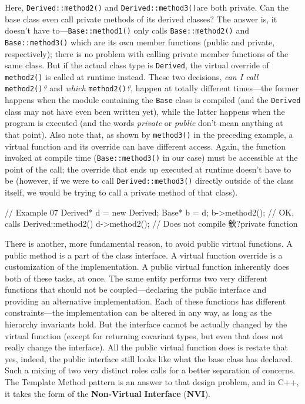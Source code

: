 Here, \texttt{Derived::method2()} and \texttt{Derived::method3()}are both private. Can the base class even call private methods of its derived classes? The answer is, it doesn't have to---\texttt{Base::method1()} only calls \texttt{Base::method2()} and \texttt{Base::method3()} which are its own member functions (public and private, respectively); there is no problem with calling private member functions of the same class. But if the actual class type is \texttt{Derived}, the virtual override of \texttt{method2()} is called at runtime instead. These two decisions, \emph{can I call} \texttt{method2()}\emph{?} and \emph{which} \texttt{method2()}\emph{?}, happen at totally different times---the former happens when the module containing the \texttt{Base} class is compiled (and the \texttt{Derived} class may not have even been written yet), while the latter happens when the program is executed (and the words \emph{private} or \emph{public} don't mean anything at that point). Also note that, as shown by \texttt{method3()} in the preceding example, a virtual function and its override can have different access. Again, the function invoked at compile time (\texttt{Base::method3()} in our case) must be accessible at the point of the call; the override that ends up executed at runtime doesn't have to be (however, if we were to call \texttt{Derived::method3()} directly outside of the class itself, we would be trying to call a private method of that class).

\begin{code}
// Example 07
Derived* d = new Derived;
Base* b = d;
b->method2();    // OK, calls Derived::method2()
d->method2();    // Does not compile 鈥?private function
\end{code}

There is another, more fundamental reason, to avoid public virtual functions. A public method is a part of the class interface. A virtual function override is a customization of the implementation. A public virtual function inherently does both of these tasks, at once. The same entity performs two very different functions that should not be coupled---declaring the public interface and providing an alternative implementation. Each of these functions has different constraints---the implementation can be altered in any way, as long as the hierarchy invariants hold. But the interface cannot be actually changed by the virtual function (except for returning covariant types, but even that does not really change the interface). All the public virtual function does is restate that yes, indeed, the public interface still looks like what the base class has declared. Such a mixing of two very distinct roles calls for a better separation of concerns. The Template Method pattern is an answer to that design problem, and in C++, it takes the form of the \textbf{Non-Virtual} \textbf{Interface} (\textbf{NVI}).

